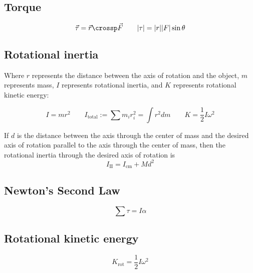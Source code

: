 \subsection{Torque}

\[
	\vec{\tau} = \vec{r} \crossp \vec{F} \qquad |\tau| = |r| |F| \sin \theta
\]

\subsection{Rotational inertia}

Where $r$ represents the distance between the axis of rotation and the object, $m$ represents mass, $I$ represents rotational inertia, and $K$ represents rotational kinetic energy:

\[
	I = mr^2 \qquad I_\text{total} := \sum m_i r_i^2 = \int r^2 dm \qquad K = \frac{1}{2} I \omega^2
\]

\begin{namedtheorem}
	If $d$ is the distance between the axis through the center of mass and the desired axis of rotation parallel to the axis through the center of mass, then the rotational inertia through the desired axis of rotation is
	\[
		I_{\text{II}} = I_{\text{cm}} + Md^2
	\]
\end{namedtheorem}

\subsection{Newton's Second Law}

\[
	\sum \tau = I \alpha
\]

\subsection{Rotational kinetic energy}

\begin{definition}
	\[
		K_{\text{rot}} = \frac{1}{2} I \omega^2
	\]
\end{definition}
